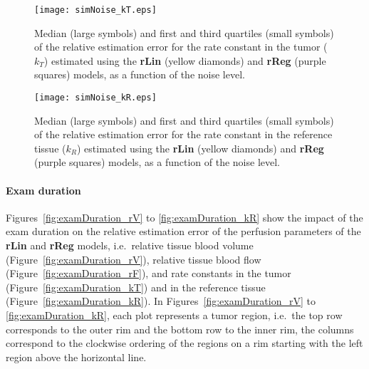 \begin{figure}
\texttt{[image: simNoise\_kT.eps]}
\caption{Median (large symbols) and first and third quartiles (small symbols) of the relative estimation error for the rate constant in the tumor ($k_T$) estimated using the \textbf{rLin} (yellow diamonds) and \textbf{rReg} (purple squares) models, as a function of the noise level.}
\label{fig:noise_kT}
\end{figure}

\begin{figure}
\texttt{[image: simNoise\_kR.eps]}
\caption{Median (large symbols) and first and third quartiles (small symbols) of the relative estimation error for the rate constant in the reference tissue ($k_R$) estimated using the \textbf{rLin} (yellow diamonds) and \textbf{rReg} (purple squares) models, as a function of the noise level.}
\label{fig:noise_kR}
\end{figure}

\paragraph{Exam duration}
Figures~\ref{fig:examDuration_rV} to \ref{fig:examDuration_kR} show the impact of the exam duration on the relative estimation error of the perfusion parameters of the \textbf{rLin} and \textbf{rReg} models, i.e.~relative tissue blood volume (Figure~\ref{fig:examDuration_rV}), relative tissue blood flow (Figure~\ref{fig:examDuration_rF}), and rate constants in the tumor (Figure~\ref{fig:examDuration_kT}) and in the reference tissue (Figure~\ref{fig:examDuration_kR}).
In Figures~\ref{fig:examDuration_rV} to \ref{fig:examDuration_kR}, each plot represents a tumor region, i.e.~the top row corresponds to the outer rim and the bottom row to the inner rim, the columns correspond to the clockwise ordering of the regions on a rim starting with the left region above the horizontal line.

